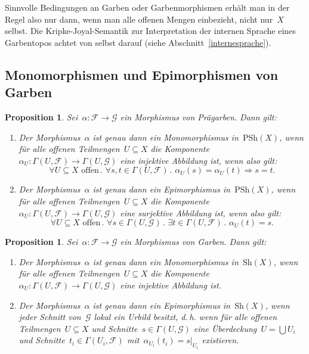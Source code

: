 \documentclass[a4paper,ngerman,12pt]{scrartcl}
\theoremstyle{definition}
\theoremstyle{plain}
\newtheorem{prop}[defn]{Proposition}
\theoremstyle{remark}
\newcommand{\F}{\mathcal{F}}
\newcommand{\G}{\mathcal{G}}
\newcommand{\Sh}{\mathrm{Sh}}
\newcommand{\PSh}{\mathrm{PSh}}
\renewcommand{\_}{\mathpunct{.}\,}
\newcommand{\?}{\,{:}\,}
\begin{document}
Sinnvolle Bedingungen an Garben oder Garbenmorphismen erhält man in der Regel
also nur dann, wenn man alle offenen Mengen einbezieht, nicht nur~$X$ selbst.
Die Kripke-Joyal-Semantik zur Interpretation der internen Sprache eines
Garbentopos achtet von selbst darauf (siehe Abschnitt~\ref{internesprache}).


\subsection{Monomorphismen und Epimorphismen von Garben}

\begin{prop}Sei~$\alpha : \F \to \G$ ein Morphismus von Prägarben. Dann gilt:
\begin{enumerate}
\item Der Morphismus~$\alpha$ ist genau dann ein Monomorphismus in~$\PSh(X)$,
wenn für alle offenen Teilmengen~$U \subseteq X$ die Komponente~$\alpha_U :
\Gamma(U,\F) \to \Gamma(U,\G)$ eine injektive Abbildung ist, wenn also gilt:
\[ \forall \text{$U \subseteq X$ offen}\_
  \forall s,t \in \Gamma(U,\F)\_
  \alpha_U(s) = \alpha_U(t) \Rightarrow s = t. \]
\item Der Morphismus~$\alpha$ ist genau dann ein Epimorphismus in~$\PSh(X)$,
wenn für alle offenen Teilmengen~$U \subseteq X$ die Komponente~$\alpha_U :
\Gamma(U,\F) \to \Gamma(U,\G)$ eine surjektive Abbildung ist, wenn also gilt:
\[ \forall \text{$U \subseteq X$ offen}\_
  \forall s \in \Gamma(U,\G)\_
  \exists t \in \Gamma(U,\F)\_
  \alpha_U(t) = s. \]
\end{enumerate}
\end{prop}

\begin{prop}Sei~$\alpha : \F \to \G$ ein Morphismus von Garben. Dann gilt:
\begin{enumerate}
\item Der Morphismus~$\alpha$ ist genau dann ein Monomorphismus in~$\Sh(X)$,
wenn für alle offenen Teilmengen~$U \subseteq X$ die Komponente~$\alpha_U :
\Gamma(U,\F) \to \Gamma(U,\G)$ eine injektive Abbildung ist.
\item Der Morphismus~$\alpha$ ist genau dann ein Epimorphismus in~$\Sh(X)$,
wenn jeder Schnitt von~$\G$ \emph{lokal} ein Urbild besitzt, d.\,h. wenn für
alle offenen Teilmengen~$U \subseteq X$ und Schnitte~$s \in \Gamma(U,\G)$ eine
Überdeckung~$U = \bigcup U_i$ und Schnitte~$t_i \in \Gamma(U_i,\F)$
mit~$\alpha_{U_i}(t_i) = s|_{U_i}$ existieren.
\end{enumerate}
\end{prop}
\end{document}
